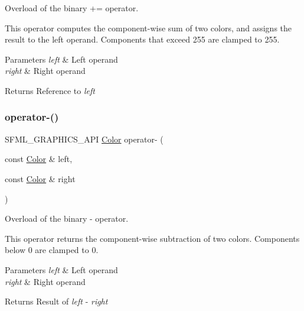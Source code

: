 Overload of the binary += operator. 

This operator computes the component-\/wise sum of two colors, and assigns the result to the left operand. Components that exceed 255 are clamped to 255.


\begin{DoxyParams}{Parameters}
{\em left} & Left operand \\
\hline
{\em right} & Right operand\\
\hline
\end{DoxyParams}
\begin{DoxyReturn}{Returns}
Reference to {\itshape left} 
\end{DoxyReturn}
\mbox{\label{classsf_1_1_color_a6d9047ddbcec2bbab8519d93300bb2aa}} 
\subsubsection{\texorpdfstring{operator-\/()}{operator-()}}
{\footnotesize\ttfamily S\+F\+M\+L\+\_\+\+G\+R\+A\+P\+H\+I\+C\+S\+\_\+\+A\+PI \hyperlink{classsf_1_1_color}{Color} operator-\/ (\begin{DoxyParamCaption}\item[{const \hyperlink{classsf_1_1_color}{Color} \&}]{left,  }\item[{const \hyperlink{classsf_1_1_color}{Color} \&}]{right }\end{DoxyParamCaption})\hspace{0.3cm}{\ttfamily [related]}}



Overload of the binary -\/ operator. 

This operator returns the component-\/wise subtraction of two colors. Components below 0 are clamped to 0.


\begin{DoxyParams}{Parameters}
{\em left} & Left operand \\
\hline
{\em right} & Right operand\\
\hline
\end{DoxyParams}
\begin{DoxyReturn}{Returns}
Result of {\itshape left} -\/ {\itshape right} 
\end{DoxyReturn}
\mbox{\label{classsf_1_1_color_a86ceee6b959136932020db4036918ecd}} 
